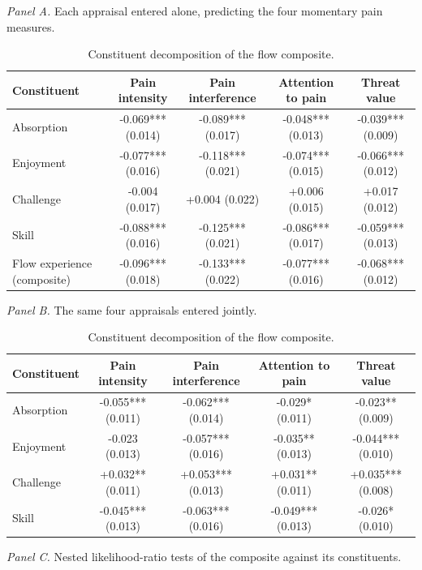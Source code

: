 \begin{table}[!htbp]
\raggedright
\caption{Constituent decomposition of the flow composite.}
\label{tab:decomposition}
\footnotesize
\begingroup
\setlength{\tabcolsep}{4pt}
\renewcommand{\arraystretch}{1.08}
\noindent\textit{Panel A.} Each appraisal entered alone, predicting the four momentary pain measures.\par\vspace{2pt}
\begin{tabular*}{\textwidth}{@{\extracolsep{\fill}}lcccc@{}}
\toprule
Constituent & Pain intensity & Pain interference & Attention to pain & Threat value \\
\midrule
Absorption & -0.069*** (0.014) & -0.089*** (0.017) & -0.048*** (0.013) & -0.039*** (0.009) \\
Enjoyment & -0.077*** (0.016) & -0.118*** (0.021) & -0.074*** (0.015) & -0.066*** (0.012) \\
Challenge & -0.004 (0.017) & +0.004 (0.022) & +0.006 (0.015) & +0.017 (0.012) \\
Skill & -0.088*** (0.016) & -0.125*** (0.021) & -0.086*** (0.017) & -0.059*** (0.013) \\
Flow experience (composite) & -0.096*** (0.018) & -0.133*** (0.022) & -0.077*** (0.016) & -0.068*** (0.012) \\
\bottomrule
\end{tabular*}
\par\vspace{6pt}\noindent\textit{Panel B.} The same four appraisals entered jointly.\par\vspace{2pt}
\begin{tabular*}{\textwidth}{@{\extracolsep{\fill}}lcccc@{}}
\toprule
Constituent & Pain intensity & Pain interference & Attention to pain & Threat value \\
\midrule
Absorption & -0.055*** (0.011) & -0.062*** (0.014) & -0.029* (0.011) & -0.023** (0.009) \\
Enjoyment & -0.023 (0.013) & -0.057*** (0.016) & -0.035** (0.013) & -0.044*** (0.010) \\
Challenge & +0.032** (0.011) & +0.053*** (0.013) & +0.031** (0.011) & +0.035*** (0.008) \\
Skill & -0.045*** (0.013) & -0.063*** (0.016) & -0.049*** (0.013) & -0.026* (0.010) \\
\bottomrule
\end{tabular*}
\par\vspace{6pt}\noindent\textit{Panel C.} Nested likelihood-ratio tests of the composite against its constituents.\par\vspace{2pt}

\end{table}
